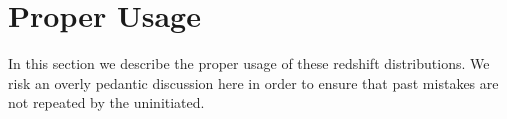 \documentclass[preprint]{aastex}
\begin{document}

\section{Proper Usage} \label{sec:usage}

In this section we describe the proper usage of these redshift distributions.
We risk an overly pedantic discussion here in order to ensure that past
mistakes are not repeated by the uninitiated.
\end{document}
